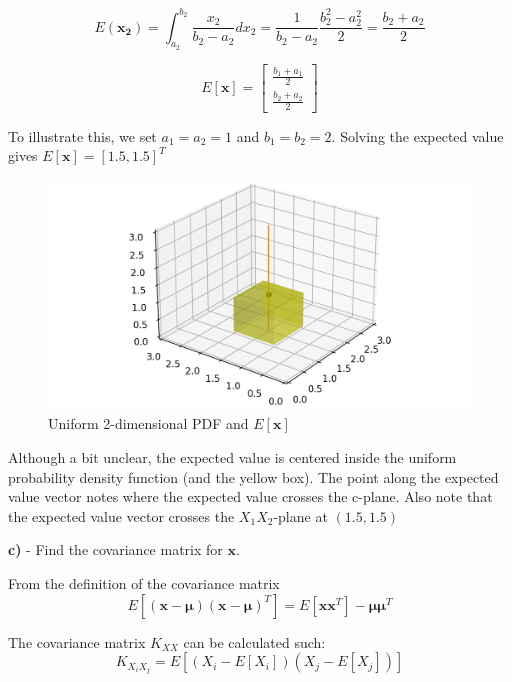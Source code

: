 \documentclass{homeworg}
\begin{document}
\begin{equation}
    E(\bm{x_2}) = \int_{a_2}^{b_2} \frac{x_2}{b_2-a_2} dx_2 = 
    \frac{1}{b_2-a_2} \frac{b_2^2-a_2^2}{2} =
    \frac{b_2+a_2}{2}
\end{equation}

\begin{equation}
    E[\bm{x}] = 
    \begin{bmatrix}
        \frac{b_1+a_1}{2} \\ \frac{b_2+a_2}{2}
        \end{bmatrix}
\end{equation}

To illustrate this, we set $a_1 = a_2 = 1$ and $b_1 = b_2 = 2$. Solving the expected value
gives $E[\bm{x}] = [1.5, 1.5]^T$
\begin{figure}[H]
    \centering
    \includegraphics[scale=0.9]{Figure.png}
    \caption{Uniform 2-dimensional PDF and $E[\bm{x}]$}
\end{figure}
Although a bit unclear, the expected value is 
centered inside the uniform probability density function (and the yellow box).
The point along the expected value vector notes where the expected value crosses the c-plane.
Also note that the expected value vector crosses the $X_1X_2$-plane at $(1.5, 1.5)$

\bigskip
\newpage
\textbf{c)} - Find the covariance matrix for $\bm{x}$.
\smallskip

From the definition of the covariance matrix
\begin{equation}
    E[(\bm{x-} \bm{\mu})(\bm{x-} \bm{\mu})^T] = E[\bm{x}\bm{x}^T] - \bm{\mu}\bm{\mu}^T
\end{equation}

The covariance matrix $K_{XX}$ can be calculated such:
\begin{equation}
    K_{{X_i}{X_j}} = E[(X_i - E[X_i])(X_j - E[X_j])]
\end{equation}
\end{document}

